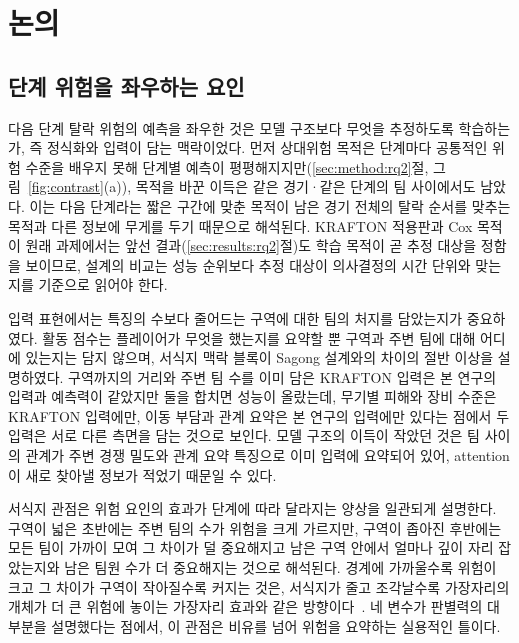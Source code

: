 \section{논의}
\label{sec:discussion}

\subsection{단계 위험을 좌우하는 요인}
\label{sec:discussion:drivers}

다음 단계 탈락 위험의 예측을 좌우한 것은 모델 구조보다 무엇을 추정하도록 학습하는가, 즉 정식화와 입력이 담는 맥락이었다.
먼저 상대위험 목적은 단계마다 공통적인 위험 수준을 배우지 못해 단계별 예측이 평평해지지만(\ref{sec:method:rq2}절, 그림~\ref{fig:contrast}(a)), 목적을 바꾼 이득은 같은 경기·같은 단계의 팀 사이에서도 남았다.
이는 다음 단계라는 짧은 구간에 맞춘 목적이 남은 경기 전체의 탈락 순서를 맞추는 목적과 다른 정보에 무게를 두기 때문으로 해석된다.
KRAFTON 적용판과 Cox 목적이 원래 과제에서는 앞선 결과(\ref{sec:results:rq2}절)도 학습 목적이 곧 추정 대상을 정함을 보이므로, 설계의 비교는 성능 순위보다 추정 대상이 의사결정의 시간 단위와 맞는지를 기준으로 읽어야 한다.

입력 표현에서는 특징의 수보다 줄어드는 구역에 대한 팀의 처지를 담았는지가 중요하였다.
활동 점수는 플레이어가 무엇을 했는지를 요약할 뿐 구역과 주변 팀에 대해 어디에 있는지는 담지 않으며, 서식지 맥락 블록이 Sagong 설계와의 차이의 절반 이상을 설명하였다.
구역까지의 거리와 주변 팀 수를 이미 담은 KRAFTON 입력은 본 연구의 입력과 예측력이 같았지만 둘을 합치면 성능이 올랐는데, 무기별 피해와 장비 수준은 KRAFTON 입력에만, 이동 부담과 관계 요약은 본 연구의 입력에만 있다는 점에서 두 입력은 서로 다른 측면을 담는 것으로 보인다.
모델 구조의 이득이 작았던 것은 팀 사이의 관계가 주변 경쟁 밀도와 관계 요약 특징으로 이미 입력에 요약되어 있어, attention이 새로 찾아낼 정보가 적었기 때문일 수 있다.

서식지 관점은 위험 요인의 효과가 단계에 따라 달라지는 양상을 일관되게 설명한다.
구역이 넓은 초반에는 주변 팀의 수가 위험을 크게 가르지만, 구역이 좁아진 후반에는 모든 팀이 가까이 모여 그 차이가 덜 중요해지고 남은 구역 안에서 얼마나 깊이 자리 잡았는지와 남은 팀원 수가 더 중요해지는 것으로 해석된다.
경계에 가까울수록 위험이 크고 그 차이가 구역이 작아질수록 커지는 것은, 서식지가 줄고 조각날수록 가장자리의 개체가 더 큰 위험에 놓이는 가장자리 효과와 같은 방향이다~\cite{Fahrig03}.
네 변수가 판별력의 대부분을 설명했다는 점에서, 이 관점은 비유를 넘어 위험을 요약하는 실용적인 틀이다.

